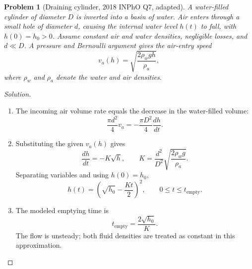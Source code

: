 \documentclass[11pt]{article}
\theoremstyle{plaincolon}
\theoremstyle{definitioncolon}
\newtheorem{problem}{Problem} %
\theoremstyle{remarkcolon}
\newenvironment{solution}{\begin{proof}[Solution]}{\end{proof}}
\numberwithin{equation}{section}
\begin{document}
\begin{problem}[Draining cylinder, 2018 INPhO Q7, adapted]
A water-filled cylinder of diameter $D$ is inverted into a basin of water. Air enters through a small hole of diameter $d$, causing the internal water level $h(t)$ to fall, with $h(0)=h_0>0$. Assume constant air and water densities, negligible losses, and $d\ll D$. A pressure and Bernoulli argument gives the air-entry speed
\[
v_a(h)=\sqrt{\frac{2\rho_wgh}{\rho_a}},
\]
where $\rho_w$ and $\rho_a$ denote the water and air densities.
\end{problem}

\begin{solution}
\begin{enumerate}
\item The incoming air volume rate equals the decrease in the water-filled volume:
\[
\frac{\pi d^2}{4}v_a=-\frac{\pi D^2}{4}\frac{dh}{dt}.
\]
\item Substituting the given $v_a(h)$ gives
\[
\frac{dh}{dt}=-K\sqrt h,\qquad
K=\frac{d^2}{D^2}\sqrt{\frac{2\rho_wg}{\rho_a}}.
\]
Separating variables and using $h(0)=h_0$,
\[
\boxed{h(t)=\left(\sqrt{h_0}-\frac{Kt}{2}\right)^2},
\qquad 0\le t\le t_{\mathrm{empty}}.
\]
\item The modeled emptying time is
\[
t_{\mathrm{empty}}=\frac{2\sqrt{h_0}}{K}.
\]
The flow is unsteady; both fluid densities are treated as constant in this approximation.
\end{enumerate}
\end{solution}
\end{document}
